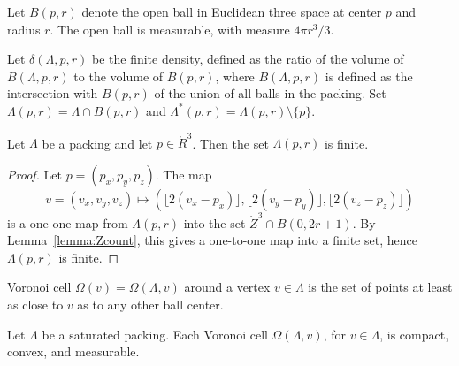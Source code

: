 


  Let $B(p,r)$ denote the open ball in
Euclidean three space at center $p$ and radius $r$.  The open ball
is measurable, with measure $4\pi r^3/3$.



Let $\delta(\Lambda,p,r)$ be the finite density, defined as the
ratio of the volume of $B(\Lambda,p,r)$ to the volume of $B(p,r)$,
where $B(\Lambda,p,r)$ is defined as the intersection with
$B(p,r)$ of the union of all balls in the packing. Set
$\Lambda(p,r) = \Lambda \cap
B(p,r)$ and $\Lambda^*(p,r) = \Lambda(p,r)\setminus \{p\}$.

\begin{lemma}
\label{lemma:Lambda-finite}
Let $\Lambda$ be a packing and let $p\in\ring{R}^3$.
Then the set $\Lambda(p,r)$ is finite.
\end{lemma}

\begin{proof}  Let $p = (p_x,p_y,p_z)$. The map
$$v=(v_x,v_y,v_z)\mapsto (\lfloor 2(v_x-p_x)
\rfloor, \lfloor 2(v_y-p_y) \rfloor, \lfloor 2(v_z-p_z) \rfloor)$$
is a one-one map from $\Lambda(p,r)$ into the set $\ring{Z}^3\cap B(0,2
r
 + 1)$.  By Lemma~\ref{lemma:Zcount}, this gives a one-to-one map
 into a finite set, hence $\Lambda(p,r)$ is finite.
\end{proof}


\begin{definition}\label{def:voronoi} Voronoi cell
$\Omega(v)=\Omega(\Lambda,v)$ around a
vertex $v\in \Lambda$ is the set of points at least as close to $v$ as to
any other ball center. 
\end{definition}

\begin{lemma}
Let $\Lambda$ be a saturated packing.
Each Voronoi cell $\Omega(\Lambda,v)$, for $v\in\Lambda$, is
compact, convex, and measurable.
\end{lemma}

